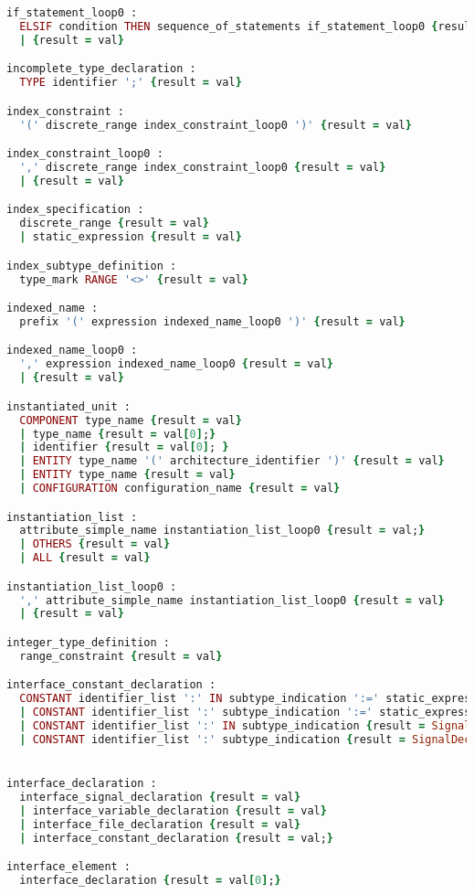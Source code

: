 \begin{lstlisting}[language=Ruby, style=rubystyle]
if_statement_loop0 :
  ELSIF condition THEN sequence_of_statements if_statement_loop0 {result = val;}
  | {result = val}

incomplete_type_declaration :
  TYPE identifier ';' {result = val}

index_constraint :
  '(' discrete_range index_constraint_loop0 ')' {result = val}

index_constraint_loop0 :
  ',' discrete_range index_constraint_loop0 {result = val}
  | {result = val}

index_specification :
  discrete_range {result = val}
  | static_expression {result = val}

index_subtype_definition :
  type_mark RANGE '<>' {result = val}

indexed_name :
  prefix '(' expression indexed_name_loop0 ')' {result = val}

indexed_name_loop0 :
  ',' expression indexed_name_loop0 {result = val}
  | {result = val}

instantiated_unit :
  COMPONENT type_name {result = val}
  | type_name {result = val[0];}
  | identifier {result = val[0]; }
  | ENTITY type_name '(' architecture_identifier ')' {result = val}
  | ENTITY type_name {result = val}
  | CONFIGURATION configuration_name {result = val}

instantiation_list :
  attribute_simple_name instantiation_list_loop0 {result = val;}
  | OTHERS {result = val}
  | ALL {result = val}

instantiation_list_loop0 :
  ',' attribute_simple_name instantiation_list_loop0 {result = val}
  | {result = val}

integer_type_definition :
  range_constraint {result = val}

interface_constant_declaration :
  CONSTANT identifier_list ':' IN subtype_indication ':=' static_expression {result = SignalDeclaration.new(val[1], val[3][0]);  }
  | CONSTANT identifier_list ':' subtype_indication ':=' static_expression {result = SignalDeclaration.new(val[1], val[3][0]);  }
  | CONSTANT identifier_list ':' IN subtype_indication {result = SignalDeclaration.new(val[1], val[3][0]);  }
  | CONSTANT identifier_list ':' subtype_indication {result = SignalDeclaration.new(val[1], nil);  }


interface_declaration :
  interface_signal_declaration {result = val}
  | interface_variable_declaration {result = val}
  | interface_file_declaration {result = val}
  | interface_constant_declaration {result = val;}

interface_element :
  interface_declaration {result = val[0];}


\end{lstlisting}
